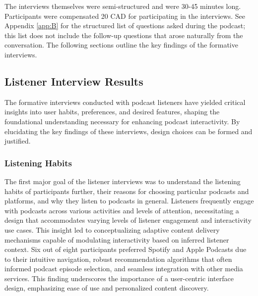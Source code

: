 \documentclass[12pt]{report}
\begin{document}
\begin{myfont}
        \indent The interviews themselves were semi-structured and were 30-45 minutes long. Participants were compensated 20 CAD for participating in the interviews. See Appendix \ref{app:B} for the structured list of questions asked during the podcast; this list does not include the follow-up questions that arose naturally from the conversation. The following sections outline the key findings of the formative interviews.
        
        \subsection{Listener Interview Results}
        \indent The formative interviews conducted with podcast listeners have yielded critical insights into user habits, preferences, and desired features, shaping the foundational understanding necessary for enhancing podcast interactivity. By elucidating the key findings of these interviews, design choices can be formed and justified.

        \subsubsection{Listening Habits}
        \indent The first major goal of the listener interviews was to understand the listening habits of participants further, their reasons for choosing particular podcasts and platforms, and why they listen to podcasts in general. Listeners frequently engage with podcasts across various activities and levels of attention, necessitating a design that accommodates varying levels of listener engagement and interactivity use cases. This insight led to conceptualizing adaptive content delivery mechanisms capable of modulating interactivity based on inferred listener context. Six out of eight participants preferred Spotify and Apple Podcasts due to their intuitive navigation, robust recommendation algorithms that often informed podcast episode selection, and seamless integration with other media services. This finding underscores the importance of a user-centric interface design, emphasizing ease of use and personalized content discovery.


\end{myfont}
\end{document}
